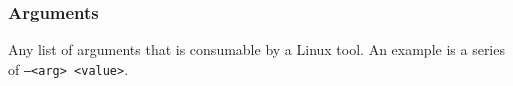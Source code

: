 \subsubsection{Arguments}
\label{arguments}

Any list of arguments that is consumable by a Linux tool. An example is a series of \texttt{--<arg> <value>}.
